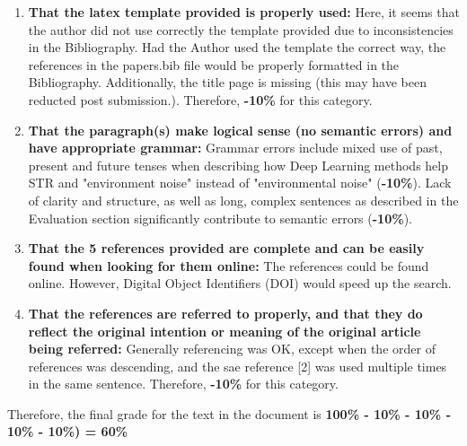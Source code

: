 \begin{enumerate}
 \item \textbf{That the latex template provided is properly used:} Here, it seems that the author did not use correctly the template provided due to inconsistencies in the Bibliography. Had the Author used the template the correct way, the references in the papers.bib file would be properly formatted in the Bibliography. Additionally, the title page is missing (this may have been reducted post submission.). Therefore, \textbf{-10\%} for this category.
 \item \textbf{That the paragraph(s) make logical sense (no semantic errors) and have appropriate grammar:} Grammar errors include mixed use of past, present and future tenses when describing how Deep Learning methods help STR and "environment noise" instead of "environmental noise" (\textbf{-10\%}). Lack of clarity and structure, as well as long, complex sentences as described in the Evaluation section significantly contribute to semantic errors (\textbf{-10\%}).
 \item \textbf{That the 5 references provided are complete and can be easily found when looking for them online:} The references could be found online. However, Digital Object Identifiers (DOI) would speed up the search.
 \item \textbf{That the references are referred to properly, and that they do reflect the original intention or meaning of the original article being referred:} Generally referencing was OK, except when the order of references was descending, and the sae reference [2] was used multiple times in the same sentence. Therefore, \textbf{-10\%} for this category.
\end{enumerate}

Therefore, the final grade for the text in the document is \textbf{100\% - 10\% - 10\% - 10\% - 10\%) = 60\%}




